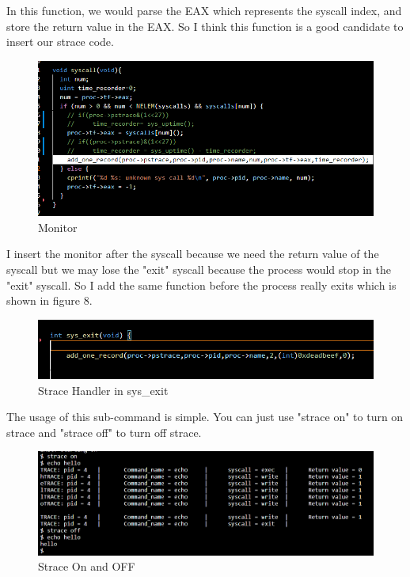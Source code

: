 \documentclass[11pt,oneside,a4paper]{article}
\begin{document}
In this function, we would parse the EAX which represents the syscall index, and 
store the return value in the EAX. So I think this function is a good candidate
to insert our strace code. 

\begin{figure}[H]
    \includegraphics[width=4.75in]{1-7.png}
    \centering
    \caption{Monitor}
\end{figure}

I insert the monitor after the syscall because we need the return value of the syscall
but we may lose the "exit" syscall because the process would stop in the "exit" syscall. 
So I add the same function before the process really exits which is shown in figure 8.

\begin{figure}[H]
    \includegraphics[width=4.75in]{1-8.png}
    \centering
    \caption{Strace Handler in sys\_exit}
\end{figure}

The usage of this sub-command is simple. You can just use "strace on" to turn on
strace and "strace off" to turn off strace.

\begin{figure}[H]
    \includegraphics[width=4.75in]{1-13.png}
    \centering
    \caption{Strace On and OFF}
\end{figure}
\end{document}
